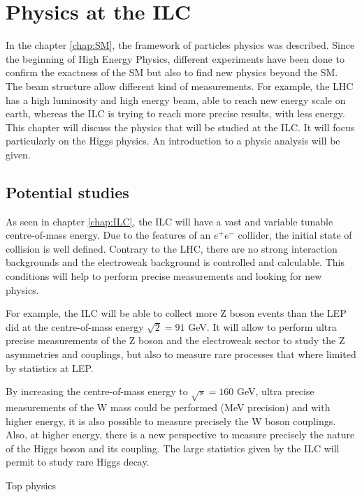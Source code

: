 \chapter{Physics at the ILC}

  In the chapter \ref{chap:SM}, the framework of particles physics was described. 
  Since the beginning of High Energy Physics, different experiments have been done to confirm the exactness of the SM but also to find new physics beyond the SM.
  The beam structure allow different kind of measurements.
  For example, the LHC has a high luminosity and high energy beam, able to reach new energy scale on earth, whereas the ILC is trying to reach more precise results, with less energy.
  This chapter will discuss the physics that will be studied at the ILC.
  It will focus particularly on the Higgs physics.
  An introduction to a physic analysis will be given. 
 
 \minitoc

  \section{Potential studies}

  As seen in chapter \ref{chap:ILC}, the ILC will have a vast and variable tunable centre-of-mass energy.
  Due to the features of an $e^+e^-$ collider, the initial state of collision is well defined.
  Contrary to the LHC, there are no strong interaction backgrounds and the electroweak background is controlled and calculable.
  This conditions will help to perform precise measurements and looking for new physics. 
  
  For example, the ILC will be able to collect more Z boson events than the LEP did at the centre-of-mass energy $\sqrt{2} = 91$ GeV.
  It will allow to perform ultra precise measurements of the Z boson and the electroweak sector to study the Z asymmetries and couplings, but also to measure rare processes that where limited by statistics at LEP.
  
  By increasing the centre-of-mass energy to $\sqrt{s} = 160$ GeV, ultra precise measurements of the W mass could be performed (MeV precision) and with higher energy, it is also possible to measure precisely the W boson couplings.
  Also, at higher energy, there is a new perspective to measure precisely the nature of the Higgs boson and its coupling.
  The large statistics given by the ILC will permit to study rare Higgs decay.

  Top physics

